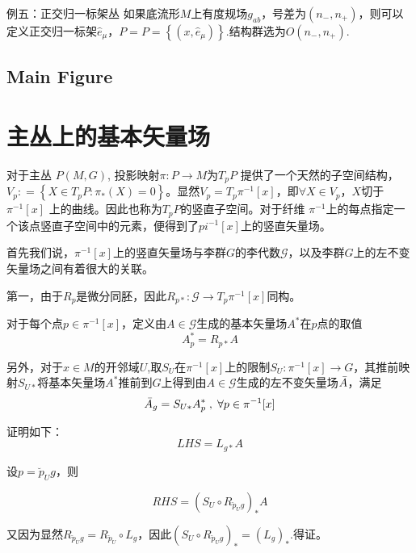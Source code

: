 \documentclass{ctexbook}
\begin{document}
例五：正交归一标架丛
如果底流形$M$上有度规场$g_{ab}$，号差为$(n_{-},n_{+})$，则可以定义正交归一标架$\hat{e}_{\mu}$，$P=P=\left\{(x,\hat{e}_{\mu})\right\}$.结构群选为$O(n_{-},n_{+})$.

\subsection{Main Figure}


\section{主丛上的基本矢量场}

对于主丛 $P(M,G)$, 投影映射$\pi\colon  P\to M$为$T_{p}P$ 提供了一个天然的子空间结构，$V_p\colon =\left\{X\in T_{p}P\colon \pi_{*}(X)=0\right\}$。显然$V_p=T_p\pi^{-1}[x]$，即$\forall X\in V_p$，$X$切于$\pi^{-1}[x]$ 上的曲线。因此也称为$T_p P$的竖直子空间。对于纤维 $\pi^{-1}$上的每点指定一个该点竖直子空间中的元素，便得到了$pi^{-1}[x]$上的竖直矢量场。

首先我们说，$\pi^{-1}[x]$上的竖直矢量场与李群$G$的李代数$\mathscr{G}$，以及李群$G$上的左不变矢量场之间有着很大的关联。

第一，由于$R_p$是微分同胚，因此$R_{p*}\colon \mathscr{G}\to T_{p}\pi^{-1}[x]$同构。

对于每个点$p\in\pi^{-1}[x]$，定义由$A\in\mathscr{G}$生成的基本矢量场$A^{*}$在$p$点的取值
\begin{equation}
    A^{*}_{p}=R_{p*}A
\end{equation}

另外，对于$x\in M$的开邻域$U$,取$S_U$在$\pi^{-1}[x]$上的限制$S_U\colon  \pi^{-1}[x]\to G$，其推前映射$S_{U*}$将基本矢量场$A^{*}$推前到$G$上得到由$A\in\mathscr{G}$生成的左不变矢量场$\Bar{A}$，满足
\begin{equation}
    \Bar{A}_{g}=S_{U*}A^{*}_{p}\;,\; \forall p\in\pi^{-1}[x]
\end{equation}

证明如下：
\begin{equation}
    LHS=L_{g*}A
\end{equation}

设$p=\breve{p}_{U}g$，则

\begin{equation}
    RHS=\left(S_U\circ R_{\breve{p}_U g}\right)_{*}A
\end{equation}

又因为显然$R_{\breve{p}_Ug}=R_{\breve{p}_U}\circ L_g$，因此$\left(S_U\circ R_{\breve{p}_U g}\right)_{*}=\left(L_g\right)_{*}$.得证。
\end{document}
